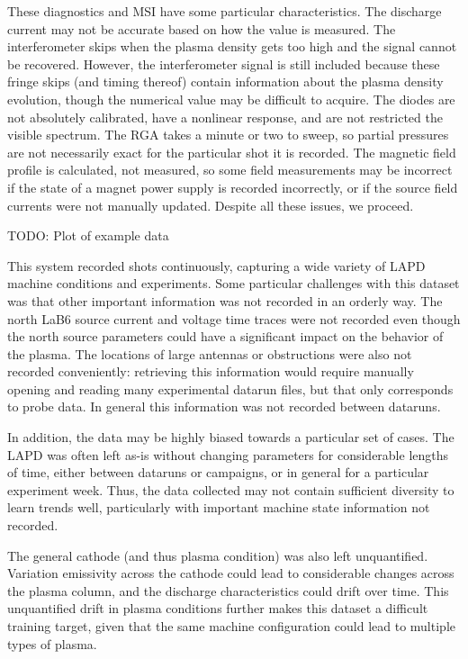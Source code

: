 These diagnostics and MSI have some particular characteristics. The discharge current may not be accurate based on how the value is measured. The interferometer skips when the plasma density gets too high and the signal cannot be recovered. However, the interferometer signal is still included because these fringe skips (and timing thereof) contain information about the plasma density evolution, though the numerical value may be difficult to acquire. The diodes are not absolutely calibrated, have a nonlinear response, and are not restricted the visible spectrum. The RGA takes a minute or two to sweep, so partial pressures are not necessarily exact for the particular shot it is recorded. The magnetic field profile is calculated, not measured, so some field measurements may be incorrect if the state of a magnet power supply is recorded incorrectly, or if the source field currents were not manually updated. Despite all these issues, we proceed.

TODO: Plot of example data

This system recorded shots continuously, capturing a wide variety of LAPD machine conditions and experiments. Some particular challenges with this dataset was that other important information was not recorded in an orderly way. The north LaB6 source current and voltage time traces were not recorded even though the north source parameters could have a significant impact on the behavior of the plasma. The locations of large antennas or obstructions were also not recorded conveniently: retrieving this information would require manually opening and reading many experimental datarun files, but that only corresponds to probe data. In general this information was not recorded between dataruns. 

In addition, the data may be highly biased towards a particular set of cases. The LAPD was often left as-is without changing parameters for considerable lengths of time, either between dataruns or campaigns, or in general for a particular experiment week. Thus, the data collected may not contain sufficient diversity to learn trends well, particularly with important machine state information not recorded.

The general cathode (and thus plasma condition) was also left unquantified. Variation emissivity across the cathode could lead to considerable changes across the plasma column, and the discharge characteristics could drift over time. This unquantified drift in plasma conditions further makes this dataset a difficult training target, given that the same machine configuration could lead to multiple types of plasma.

